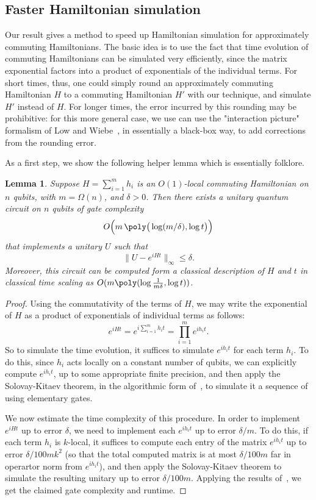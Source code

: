 \documentclass[11pt]{article}
\theoremstyle{plain}
\newtheorem{lemma}[theorem]{Lemma}
\begin{document}
\subsection{Faster Hamiltonian simulation}\label{sec:hamiltonian-simulation}
Our result gives a method to speed up Hamiltonian simulation for approximately commuting Hamiltonians. The basic idea is to use the fact that time evolution of commuting Hamiltonians can be simulated very efficiently, since the matrix exponential factors into a product of exponentials of the individual terms. For short times, thus, one could simply round an approximately commuting Hamiltonian $H$ to a commuting Hamiltonian $H'$ with our technique, and simulate $H'$ instead of $H$. For longer times, the error incurred by this rounding may be prohibitive: for this more general case, we use can use the "interaction picture" formalism of Low and Wiebe~\cite{low2018hamiltonian}, in essentially a black-box way, to add corrections from the rounding error. 

As a first step, we show the following helper lemma which is essentially folklore.
\begin{lemma}\label{lem:com-ham-fast}
    Suppose $H = \sum_{i=1}^{m} h_i$ is an $O(1)$-local commuting Hamiltonian on $n$ qubits, with $m = \Omega(n)$, and $\delta > 0$. Then there exists a unitary quantum circuit on $n$ qubits of gate complexity 
     \[ O\Big(m \, \poly\big(\log(m/\delta), \log t\big)\Big)\]
     that implements a unitary $U$ such that
     \[ \|U - e^{iHt} \|_\infty \leq \delta. \] 
     Moreover, this circuit can be computed form a classical description of $H$ and $t$ in classical time scaling as $O(m \poly(\log\frac{1}{m\delta}, \log t))$.
\end{lemma}
\begin{proof}
   Using the commutativity of the terms of $H$, we may write the exponential of $H$ as a product of exponentials of individual terms as follows:
    \[ e^{iHt} = e^{i\sum_{i=1}^{m} h_i t} = \prod_{i=1}^{m} e^{i h_i t}. \]
    So to simulate the time evolution, it suffices to simulate $e^{i h_i t}$ for each term $h_i$.
    To do this, since $h_i$ acts locally on a constant number of qubits, we can explicitly compute $e^{ih_i t}$, up to some appropriate finite precision, and then apply the Solovay-Kitaev theorem, in the algorithmic form of~\cite{dawson2006solovay}, to simulate it a sequence of using elementary gates.
    
    We now estimate the time complexity of this procedure. In order to implement $e^{iHt}$ up to error $\delta$, we need to implement each $e^{i h_i t}$ up to error $\delta/m$. To do this, if each term $h_i$ is $k$-local, it suffices to compute each entry of the matrix $e^{i h_i t}$ up to error $\delta/100mk^2$ (so that the total computed matrix is at most $\delta/100m$ far in operartor norm from $e^{ih_i t}$), and then apply the Solovay-Kitaev theorem to simulate the resulting unitary up to error $\delta/100m$. Applying the results of~\cite{dawson2006solovay}, we get the claimed gate complexity and runtime.
\end{proof}
\end{document}
